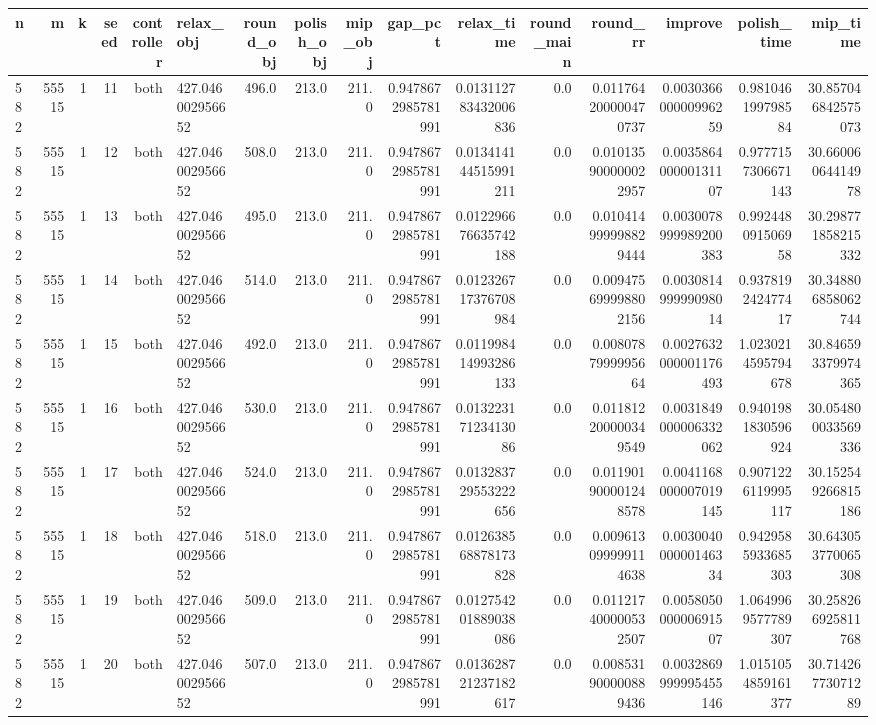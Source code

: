 \begin{tabular}{lrrrrlrrrrrrrrrr}
\hline
n & m & k & seed & controller & relax_obj & round_obj & polish_obj & mip_obj & gap_pct & relax_time & round_main & round_rr & improve & polish_time & mip_time \\ \hline
582 & 55515 & 1 & 11 & both & 427.046002956652 & 496.0 & 213.0 & 211.0 & 0.9478672985781991 & 0.013112783432006836 & 0.0 & 0.011764200000470737 & 0.003036600000996259 & 0.981046199798584 & 30.857046842575073 \\
582 & 55515 & 1 & 12 & both & 427.046002956652 & 508.0 & 213.0 & 211.0 & 0.9478672985781991 & 0.013414144515991211 & 0.0 & 0.010135900000022957 & 0.003586400000131107 & 0.9777157306671143 & 30.66006064414978 \\
582 & 55515 & 1 & 13 & both & 427.046002956652 & 495.0 & 213.0 & 211.0 & 0.9478672985781991 & 0.012296676635742188 & 0.0 & 0.010414999998829444 & 0.0030078999989200383 & 0.992448091506958 & 30.298771858215332 \\
582 & 55515 & 1 & 14 & both & 427.046002956652 & 514.0 & 213.0 & 211.0 & 0.9478672985781991 & 0.012326717376708984 & 0.0 & 0.009475699998802156 & 0.003081499999098014 & 0.937819242477417 & 30.348806858062744 \\
582 & 55515 & 1 & 15 & both & 427.046002956652 & 492.0 & 213.0 & 211.0 & 0.9478672985781991 & 0.011998414993286133 & 0.0 & 0.0080787999995664 & 0.0027632000001176493 & 1.0230214595794678 & 30.846593379974365 \\
582 & 55515 & 1 & 16 & both & 427.046002956652 & 530.0 & 213.0 & 211.0 & 0.9478672985781991 & 0.01322317123413086 & 0.0 & 0.011812200000349549 & 0.0031849000006332062 & 0.9401981830596924 & 30.054800033569336 \\
582 & 55515 & 1 & 17 & both & 427.046002956652 & 524.0 & 213.0 & 211.0 & 0.9478672985781991 & 0.013283729553222656 & 0.0 & 0.011901900001248578 & 0.0041168000007019145 & 0.9071226119995117 & 30.152549266815186 \\
582 & 55515 & 1 & 18 & both & 427.046002956652 & 518.0 & 213.0 & 211.0 & 0.9478672985781991 & 0.012638568878173828 & 0.0 & 0.009613099999114638 & 0.003004000000146334 & 0.9429585933685303 & 30.643053770065308 \\
582 & 55515 & 1 & 19 & both & 427.046002956652 & 509.0 & 213.0 & 211.0 & 0.9478672985781991 & 0.012754201889038086 & 0.0 & 0.011217400000532507 & 0.005805000000691507 & 1.0649969577789307 & 30.258266925811768 \\
582 & 55515 & 1 & 20 & both & 427.046002956652 & 507.0 & 213.0 & 211.0 & 0.9478672985781991 & 0.013628721237182617 & 0.0 & 0.008531900000889436 & 0.0032869999995455146 & 1.0151054859161377 & 30.71426773071289 \\
\hline
\end{tabular}

